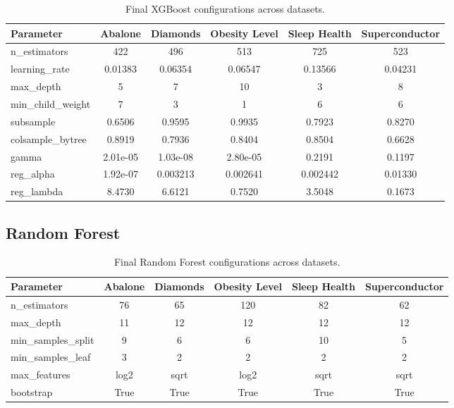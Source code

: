 \begin{table}[h]
  \centering
  \small
  \setlength{\tabcolsep}{4pt}
  \caption{Final XGBoost configurations across datasets.}
  \label{tab:xgb-config}
  \begin{tabular}{lccccc}
    \toprule
    \textbf{Parameter} & \textbf{Abalone} & \textbf{Diamonds} & \textbf{Obesity Level} & \textbf{Sleep Health} & \textbf{Superconductor} \\
    \midrule
    n\_estimators      & 422        & 496        & 513        & 725        & 523 \\
    learning\_rate     & 0.01383    & 0.06354    & 0.06547    & 0.13566    & 0.04231 \\
    max\_depth         & 5          & 7          & 10         & 3          & 8 \\
    min\_child\_weight & 7          & 3          & 1          & 6          & 6 \\
    subsample          & 0.6506     & 0.9595     & 0.9935     & 0.7923     & 0.8270 \\
    colsample\_bytree  & 0.8919     & 0.7936     & 0.8404     & 0.8504     & 0.6628 \\
    gamma              & 2.01e-05   & 1.03e-08   & 2.80e-05   & 0.2191     & 0.1197 \\
    reg\_alpha         & 1.92e-07   & 0.003213   & 0.002641   & 0.002442   & 0.01330 \\
    reg\_lambda        & 8.4730     & 6.6121     & 0.7520     & 3.5048     & 0.1673 \\
    \bottomrule
  \end{tabular}
\end{table}

\subsection{Random Forest}
\label{tab:rf-config}

\begin{table}[h]
  \centering
  \small
  \setlength{\tabcolsep}{5pt}
  \caption{Final Random Forest configurations across datasets.}
  \label{tab:rf-config}
  \begin{tabular}{lccccc}
    \toprule
    \textbf{Parameter} & \textbf{Abalone} & \textbf{Diamonds} & \textbf{Obesity Level} & \textbf{Sleep Health} & \textbf{Superconductor} \\
    \midrule
    n\_estimators        & 76    & 65    & 120   & 82    & 62 \\
    max\_depth           & 11    & 12    & 12    & 12    & 12 \\
    min\_samples\_split  & 9     & 6     & 6     & 10    & 5 \\
    min\_samples\_leaf   & 3     & 2     & 2     & 2     & 2 \\
    max\_features        & log2  & sqrt  & log2  & sqrt  & sqrt \\
    bootstrap            & True  & True  & True  & True  & True \\
    \bottomrule
  \end{tabular}
\end{table}

